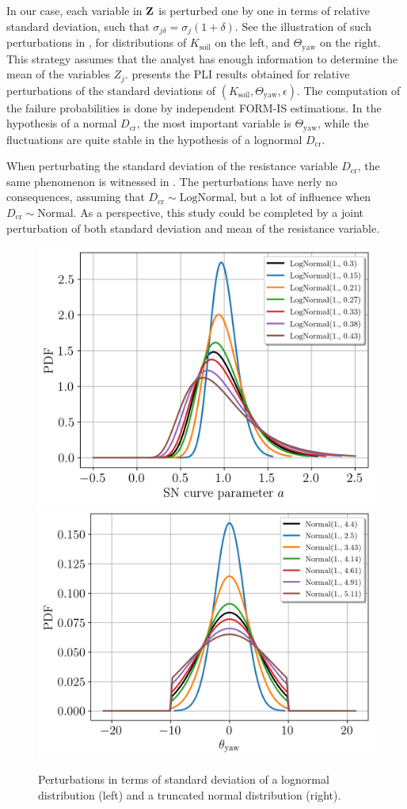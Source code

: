 In our case, each variable in ${\bf Z}$ is perturbed one by one in terms of relative standard deviation, such that $\sigma_{j \delta} = \sigma_j (1+\delta)$. 
See the illustration of such perturbations in , for distributions of $K_{\mathrm{soil}}$ on the left, and $\Theta_{\mathrm{yaw}}$ on the right.
This strategy assumes that the analyst has enough information to determine the mean of the variables $Z_j$. 
 presents the PLI results obtained for relative perturbations of the standard deviations of $(K_{\mathrm{soil}}, \Theta_{\mathrm{yaw}}, \epsilon)$. 
The computation of the failure probabilities is done by independent FORM-IS estimations. 
In the hypothesis of a normal $D_{\mathrm{cr}}$, the most important variable is $\Theta_{\mathrm{yaw}}$, while the fluctuations are quite stable in the hypothesis of a lognormal $D_{\mathrm{cr}}$. 

When perturbating the standard deviation of the resistance variable $D_{\mathrm{cr}}$, the same phenomenon is witnessed in . 
The perturbations have nerly no consequences, assuming that $D_{\mathrm{cr}}\sim \mathrm{LogNormal}$, but a lot of influence when $D_{\mathrm{cr}}\sim \mathrm{Normal}$.  
As a perspective, this study could be completed by a joint perturbation of both standard deviation and mean of the resistance variable.


\begin{figure}
    \centering
        \includegraphics[width=0.43\linewidth]{./part3/figures/OWT/lognormal_pert.png}
        \includegraphics[width=0.44\linewidth]{./part3/figures/OWT/normal_pert.png}
    \caption{Perturbations in terms of standard deviation of a lognormal distribution (left) and a truncated normal distribution (right).}
    \label{fig:perturbations}
\end{figure}


